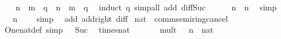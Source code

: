 \begin{isabellebody}
\ \ \isamarkupfalse%
\ {\isachardoublequoteopen}n\ {\isacharminus}{\kern0pt}\ m\ {\isacharminus}{\kern0pt}\ q\ {\isacharequal}{\kern0pt}\ n\ {\isacharminus}{\kern0pt}\ {\isacharparenleft}{\kern0pt}m\ {\isacharplus}{\kern0pt}\ q{\isacharparenright}{\kern0pt}{\isachardoublequoteclose}\ \isamarkupfalse%
\ {\isacharparenleft}{\kern0pt}induct\ q{\isacharparenright}{\kern0pt}\ {\isacharparenleft}{\kern0pt}simp{\isacharunderscore}{\kern0pt}all\ add{\isacharcolon}{\kern0pt}\ diff{\isacharunderscore}{\kern0pt}Suc{\isacharparenright}{\kern0pt}\isanewline
\ \ \isamarkupfalse%
\ {\isachardoublequoteopen}{}\ {\isacharplus}{\kern0pt}\ n\ {\isacharequal}{\kern0pt}\ n{\isachardoublequoteclose}\ \isamarkupfalse%
\ simp\isanewline
\ \ \isamarkupfalse%
\ {\isachardoublequoteopen}{}\ {\isacharminus}{\kern0pt}\ n\ {\isacharequal}{\kern0pt}\ {}{\isachardoublequoteclose}\ \isamarkupfalse%
\ simp\isanewline
{}\isamarkupfalse%
%
\endisatagproof
{\isafoldproof}%
%
\isadelimproof
\isanewline
%
\endisadelimproof
\isanewline
{}\isamarkupfalse%
\isanewline
\isanewline
{}\isamarkupfalse%
\ {\isacharparenleft}{\kern0pt}\ add{\isacharunderscore}{\kern0pt}{}\ add{\isacharunderscore}{\kern0pt}{}{\isacharunderscore}{\kern0pt}right\ diff{\isacharunderscore}{\kern0pt}{}\isanewline
\isanewline
{}\isamarkupfalse%
\ nat\ {\isacharcolon}{\kern0pt}{\isacharcolon}{\kern0pt}\ comm{\isacharunderscore}{\kern0pt}semiring{\isacharunderscore}{\kern0pt}{}{\isacharunderscore}{\kern0pt}cancel\isanewline
{}\isanewline
\isanewline
{}\isamarkupfalse%
\ One{\isacharunderscore}{\kern0pt}nat{\isacharunderscore}{\kern0pt}def\ {\isacharbrackleft}{\kern0pt}simp{\isacharbrackright}{\kern0pt}{\isacharcolon}{\kern0pt}\ {\isachardoublequoteopen}{}\ {\isacharequal}{\kern0pt}\ Suc\ {}{\isachardoublequoteclose}\isanewline
\isanewline
{}\isamarkupfalse%
\ times{\isacharunderscore}{\kern0pt}nat\isanewline
\ \ \isanewline
\ \ \ \ mult{\isacharunderscore}{\kern0pt}{}{\isacharcolon}{\kern0pt}\ {\isachardoublequoteopen}{}\ {\isacharasterisk}{\kern0pt}\ n\ {\isacharequal}{\kern0pt}\ {\isacharparenleft}{\kern0pt}{}{\isacharcolon}{\kern0pt}{\isacharcolon}{\kern0pt}nat{\isacharparenright}{\kern0pt}{\isachardoublequoteclose}\isanewline

\end{isabellebody}
